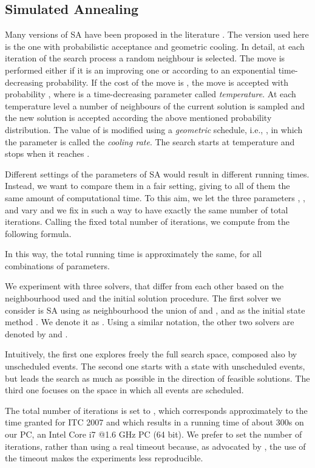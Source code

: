 \documentclass[authoryear,preprint,a4paper,12pt]{elsarticle}
\begin{document}
\subsection{Simulated Annealing}

Many versions of SA have been proposed in the literature \citep[see,
e.g.,][]{KiGV83,Egle90,AaLe97,HoSt05}. The version used here is
the one with probabilistic acceptance and geometric cooling. In detail, at each
iteration of the search process a random neighbour is selected. The
move is performed either if it is an improving one or according to an
exponential time-decreasing probability. If the cost of the
move is , the move is accepted with probability
, where  is a time-decreasing parameter called
\emph{temperature}. At each temperature level a number  of
neighbours of the current solution is sampled and the new solution is
accepted according the above mentioned probability distribution.  The
value of  is modified using a \emph{geometric} schedule, i.e.,
, in which the parameter  is called
the \emph{cooling rate}.  The search starts at temperature  and
stops when it reaches .

Different settings of the parameters of SA would result in different
running times. Instead, we want to compare them in a fair
setting, giving to all of them the same amount of computational time.
To this aim, we let the three parameters , , and 
vary and we fix  in such a way to have exactly the same number of
total iterations. Calling  the fixed total number of
iterations, we compute  from the following formula.



In this way, the total running time is approximately the same, for all
combinations of parameters.

We experiment with three solvers, that differ from each other based on
the neighbourhood used and the initial solution procedure. The first
solver we consider is SA using as neighbourhood the union of
 and , and  as the initial state method .
We denote it as . Using a similar notation, the
other two solvers are denoted by  and
.

Intuitively, the first one explores freely the full search space,
composed also by unscheduled events. The second one starts with a
state with unscheduled events, but leads the search as much as
possible in the direction of feasible solutions. The third one
focuses on the space in which all events are scheduled.

The total number of iterations is set to , which
corresponds approximately to the time granted for ITC 2007 and which
results in a running time of about 300s on our PC, an Intel Core i7 @1.6 GHz
PC (64 bit). We prefer to set the number of iterations, rather than
using a real timeout because, as advocated by \citet{John96}, the use
of the timeout makes the experiments less reproducible.
\end{document}

